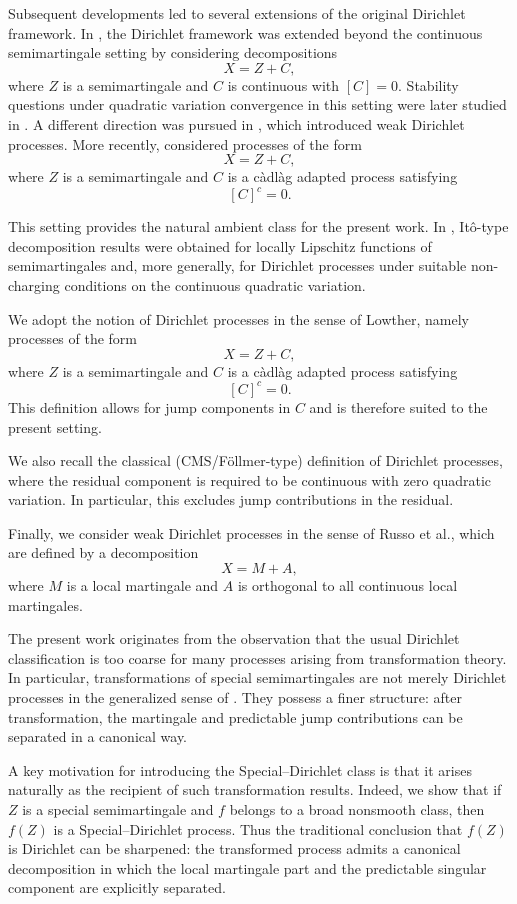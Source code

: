 \documentclass[a4paper,10pt]{article}
\begin{document}
Subsequent developments led to several extensions of the original
Dirichlet framework. In \cite{NonCont}, the Dirichlet framework was extended beyond the
continuous semimartingale setting by considering decompositions
\[
X=Z+C,
\]
where \(Z\) is a semimartingale and \(C\) is continuous with
\([C]=0\). Stability questions under quadratic variation convergence in this setting were later studied
in \cite{Collectanea}. A different direction was pursued in \cite{WeakDir},
which introduced weak Dirichlet processes. More recently,
\cite{Low} considered processes of the form
\[
X=Z+C,
\]
where \(Z\) is a semimartingale and \(C\) is a c\`adl\`ag adapted
process satisfying
\[
[C]^c=0.
\]

This setting provides the natural ambient class for the present work.
In \cite{Low}, It\^o-type decomposition results were obtained for
locally Lipschitz functions of semimartingales and, more generally,
for Dirichlet processes under suitable non-charging conditions on the
continuous quadratic variation.


We adopt the notion of Dirichlet processes in the sense of Lowther,
namely processes of the form
\[
        X = Z + C,
\]
where \(Z\) is a semimartingale and \(C\) is a càdlàg adapted process
satisfying
\[
        [C]^c = 0.
\]
This definition allows for jump components in \(C\) and is therefore
suited to the present setting.

We also recall the classical (CMS/Föllmer-type) definition of
Dirichlet processes, where the residual component is required to be
continuous with zero quadratic variation. In particular, this excludes
jump contributions in the residual.

Finally, we consider weak Dirichlet processes in the sense of
Russo et al., which are defined by a decomposition
\[
        X = M + A,
\]
where \(M\) is a local martingale and \(A\) is orthogonal to all
continuous local martingales.

\medskip

The present work originates from the observation that the usual
Dirichlet classification is too coarse for many processes arising from
transformation theory. In particular, transformations of special
semimartingales are not merely Dirichlet processes in the generalized
sense of \cite{Low}. They possess a finer structure: after
transformation, the martingale and predictable jump contributions can
be separated in a canonical way.

A key motivation for introducing the Special--Dirichlet class is that
it arises naturally as the recipient of such transformation results.
Indeed, we show that if \(Z\) is a special semimartingale and \(f\)
belongs to a broad nonsmooth class, then \(f(Z)\) is a
Special--Dirichlet process. Thus the traditional conclusion that
\(f(Z)\) is Dirichlet can be sharpened: the transformed process admits
a canonical decomposition in which the local martingale part and the
predictable singular component are explicitly separated.
\end{document}
